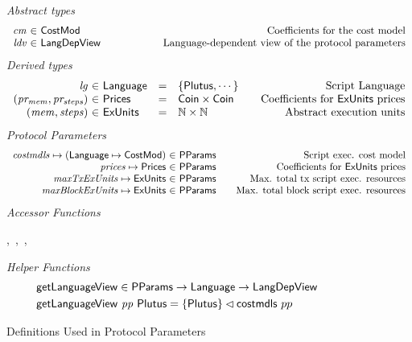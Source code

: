 \begin{figure*}[htb]
  \emph{Abstract types}
  \begin{equation*}
    \begin{array}{r@{~\in~}l@{\qquad\qquad\qquad}r}
      \var{cm} & \CostMod & \text{Coefficients for the cost model} \\
      \var{ldv} & \LangDepView & \text{Language-dependent view of the protocol parameters}
    \end{array}
  \end{equation*}
  \emph{Derived types}
  \begin{equation*}
    \begin{array}{r@{~\in~}l@{\quad=\quad}l@{\qquad}r}
      \var{lg}
      & \Language
      & \{\Plutus, \dotsb\}
      & \text{Script Language}
      \\
      \var{(pr_{mem}, pr_{steps})}
      & \Prices
      & \Coin \times \Coin
      & \text {Coefficients for $\ExUnits$ prices}
      \\
      \var{(mem, steps)}
      & \ExUnits
      & \N \times \N
      & \text{Abstract execution units} \\
    \end{array}
  \end{equation*}
  \emph{Protocol Parameters}
  \begin{equation*}
      \begin{array}{r@{~\in~}l@{\qquad}r}
        \var{costmdls} \mapsto (\Language \mapsto \CostMod) & \PParams & \text{Script exec. cost model}\\
        \var{prices} \mapsto \Prices & \PParams & \text{Coefficients for $\ExUnits$ prices} \\
        \var{maxTxExUnits} \mapsto \ExUnits & \PParams & \text{Max. total tx script exec. resources}\\
        \var{maxBlockExUnits} \mapsto \ExUnits & \PParams & \text{Max. total block script exec. resources}\\
      \end{array}
  \end{equation*}
  \emph{Accessor Functions}
  \begin{center}
  ,~,~,~
  \end{center}
  \emph{Helper Functions}
  \begin{align*}
    & \mathsf{getLanguageView} \in \mathsf{PParams} \to \mathsf{Language} \to \mathsf{LangDepView} \\
    & \mathsf{getLanguageView}~\mathit{pp}~\mathsf{Plutus} = \{\mathsf{Plutus}\} \lhd \mathsf{costmdls}~{pp}
  \end{align*}
  \caption{Definitions Used in Protocol Parameters}
  \label{fig:defs:protocol-parameters}
\end{figure*}
